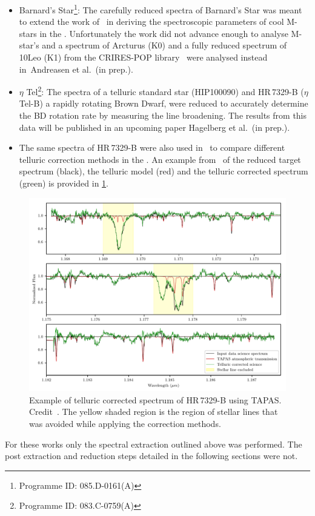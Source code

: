 \begin{itemize}
    \setlength\itemsep{-0.3em} %
    \item Barnard's Star\footnote{Programme {{ID}}: 085.D-0161(A)}: The carefully reduced \nir{} spectra of Barnard's Star was meant to extend the work of~\citet{andreasen_nearinfrared_2016} in deriving the spectroscopic parameters of cool M-stars in the \nir{}.
    Unfortunately the work did not advance enough to analyse M-star's and a spectrum of {Arcturus} (K0) and a fully reduced spectrum of {10Leo} (K1) from the {CRIRES}-POP library~\citep{nicholls_crirespop_2017} were analysed instead in~{Andreasen et al.\ (in prep.)}.
    \item \(\eta\) Tel\footnote{Programme {{ID}}: 083.C-0759(A)}: The spectra of a telluric standard star (HIP100090) and {HR\,7329-B} (\(\eta\) Tel-B) a rapidly rotating Brown Dwarf, were reduced to accurately determine the {BD} rotation rate by measuring the line broadening.
    The results from this data will be published in an upcoming paper {Hagelberg et al.\ (in prep.)}.
    \item The same spectra of {HR\,7329-B} were also used in~\citet{ulmer-moll_telluric_2018} to compare different telluric correction methods in the \nir{}.
    An example from~\citet[][(B.3)]{ulmer-moll_telluric_2018} of the reduced target spectrum (black), the telluric model (red) and the telluric corrected spectrum (green) is provided in \cref{fig:ulmermol2018tellcorrcrires48}.
\end{itemize}

\begin{figure}
    \centering
    \includegraphics[width=0.8\linewidth]{figures/reduction/ulmermol2018_tell_corr_CRIRES_48}
    \caption[Example of telluric corrected spectrum of {HR\,7329-B} using {TAPAS}.]{Example of telluric corrected spectrum of {HR\,7329-B} using {TAPAS}.
Credit~\citet[][]{ulmer-moll_telluric_2018}.
The yellow shaded region is the region of stellar lines that was avoided while applying the correction methods.}
    \label{fig:ulmermol2018tellcorrcrires48}
\end{figure}

For these works only the spectral extraction outlined above was performed.
The post extraction and reduction steps detailed in the following sections were not.



